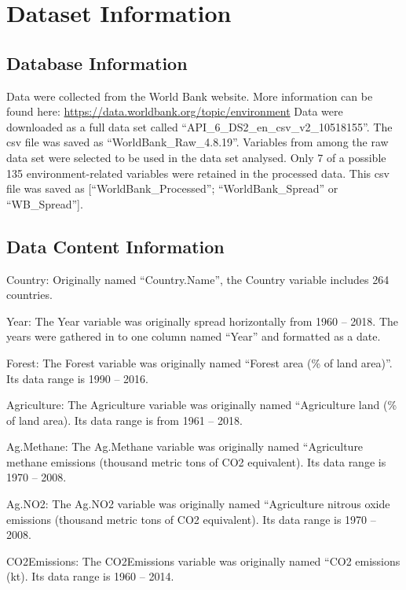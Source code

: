 \documentclass[12pt,]{article}
\begin{document}
\newpage

\section{Dataset Information}\label{dataset-information}

\subsection{Database Information}\label{database-information}

Data were collected from the World Bank website. More information can be
found here: \url{https://data.worldbank.org/topic/environment} Data were
downloaded as a full data set called
``API\_6\_DS2\_en\_csv\_v2\_10518155''. The csv file was saved as
``WorldBank\_Raw\_4.8.19''. Variables from among the raw data set were
selected to be used in the data set analysed. Only 7 of a possible 135
environment-related variables were retained in the processed data. This
csv file was saved as {[}``WorldBank\_Processed''; ``WorldBank\_Spread''
or ``WB\_Spread''{]}.

\subsection{Data Content Information}\label{data-content-information}

Country: Originally named ``Country.Name'', the Country variable
includes 264 countries.

Year: The Year variable was originally spread horizontally from 1960 --
2018. The years were gathered in to one column named ``Year'' and
formatted as a date.

Forest: The Forest variable was originally named ``Forest area (\% of
land area)''. Its data range is 1990 -- 2016.

Agriculture: The Agriculture variable was originally named ``Agriculture
land (\% of land area). Its data range is from 1961 -- 2018.

Ag.Methane: The Ag.Methane variable was originally named ``Agriculture
methane emissions (thousand metric tons of CO2 equivalent). Its data
range is 1970 -- 2008.

Ag.NO2: The Ag.NO2 variable was originally named ``Agriculture nitrous
oxide emissions (thousand metric tons of CO2 equivalent). Its data range
is 1970 -- 2008.

CO2Emissions: The CO2Emissions variable was originally named ``CO2
emissions (kt). Its data range is 1960 -- 2014.
\end{document}
